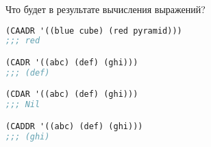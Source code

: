 Что будет в результате вычисления выражений?

\begin{lstlisting}[language=Lisp]
(CAADR '((blue cube) (red pyramid)))
;;; red

(CADR '((abc) (def) (ghi)))
;;; (def)

(CDAR '((abc) (def) (ghi)))
;;; Nil

(CADDR '((abc) (def) (ghi)))
;;; (ghi)
\end{lstlisting}

